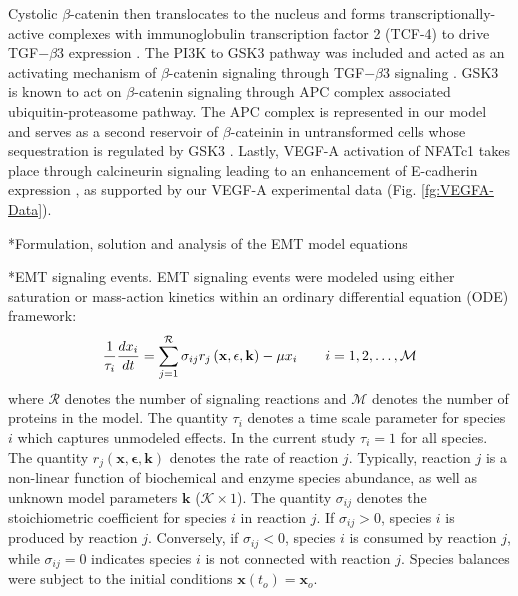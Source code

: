 \documentclass[12pt]{article}
\makeatletter
\renewcommand\subsection{\@startsection
	{subsection}{2}{0mm}
	{-0.05in}
	{-0.5\baselineskip}
	{\normalfont\normalsize\bfseries}}
\renewcommand\subsubsection{\@startsection
	{subsubsection}{2}{0mm}
	{-0.05in}
	{-0.5\baselineskip}
	{\normalfont\normalsize\itshape}}
\makeatother
\begin{document}
Cystolic $\beta$-catenin then translocates to the nucleus and forms transcriptionally-active complexes with immunoglobulin transcription factor 2 (TCF-4)
to drive TGF$-\beta$3 expression \citep{Medici:2008fk}. The PI3K to GSK3 pathway was included and acted as an activating mechanism of $\beta$-catenin signaling through TGF$-\beta$3 signaling \citep{Medici:2008fk}. GSK3 is known to act on $\beta$-catenin signaling through APC complex associated ubiquitin-proteasome pathway. The APC complex is represented in our model and serves as a second reservoir  of $\beta$-cateinin in untransformed cells whose sequestration is regulated by GSK3 \citep{Zhou:2004kx,Larue:2005vn,Medici:2008fk}. Lastly, VEGF-A activation of NFATc1 takes place through calcineurin signaling leading to an enhancement of E-cadherin expression \citep{Suehiro:2014aa},
as supported by our VEGF-A experimental data (Fig. \ref{fg:VEGFA-Data}).


\subsection*{Formulation, solution and analysis of the EMT model equations}
\subsubsection*{EMT signaling events.}
EMT signaling events were modeled using either saturation or mass-action kinetics within an ordinary differential equation (ODE) framework:
\begin{equation}
	\frac{1}{\tau_{i}}\frac{dx_{i}}{dt}  =  \sum_{j = 1}^{\mathcal{R}}\sigma_{ij}r_{j}\left(\mathbf{x},\mathbf{\epsilon},\mathbf{k}\right)-\mu x_{i}\qquad{i=1,2,\hdots,\mathcal{M}}\\
\end{equation}
where $\mathcal{R}$ denotes the number of signaling reactions and $\mathcal{M}$ denotes the number of proteins in the model.
The quantity $\tau_{i}$ denotes a time scale parameter for species $i$ which captures unmodeled effects. In the current study $\tau_{i} = 1$ for all species.
The quantity $r_{j}\left(\mathbf{x},\mathbf{\epsilon},\mathbf{k}\right)$ denotes the rate of reaction $j$.
Typically, reaction $j$ is a non-linear function of biochemical and enzyme species abundance, as well as unknown model parameters $\mathbf{k}$ ($\mathcal{K}\times{1}$).
The quantity $\sigma_{ij}$ denotes the stoichiometric coefficient for species $i$ in reaction $j$.
If $\sigma_{ij}>0$, species $i$ is produced by reaction $j$.
Conversely, if $\sigma_{ij}<0$, species $i$ is consumed by reaction $j$, while $\sigma_{ij} = 0$ indicates species $i$ is not connected with reaction $j$.
Species balances were subject to the initial conditions $\mathbf{x}\left(t_{o}\right) = \mathbf{x}_{o}$.
\end{document}
